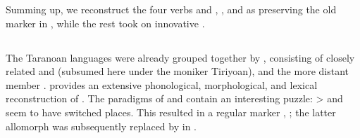 %




Summing up, we reconstruct the four verbs  and  ,  , and   as preserving the old  marker  in \PWai, while the rest took on innovative .

\subsection{\PTir {}}
\label{sec:taranoan}
The Taranoan languages were already grouped together by \textcite{girard1971proto}, consisting of closely related \trio and \akuriyo (subsumed here under the moniker Tiriyoan), and the more distant member \carijo.
\textcite{meira1998proto} provides an extensive phonological, morphological, and lexical reconstruction of \PTar.
The \setone paradigms of \trio and \akuriyo contain an interesting puzzle: \PC {}>  and   seem to have switched places.
This resulted in a regular  marker ,  ; the latter allomorph was subsequently replaced by  in \akuriyo {}.

